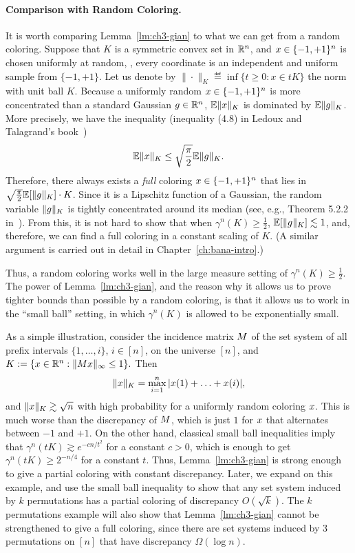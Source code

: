 \paragraph{Comparison with Random Coloring.}
It is worth comparing Lemma~\ref{lm:ch3-gian} to what we can get from
a random coloring.
Suppose that \(K\) is a symmetric
convex set in \(\mathbb{R}^n\), and $x \in \{-1,+1\}^n$ is
chosen uniformly at random, \ie, every coordinate is an independent
and uniform sample from $\{-1,+1\}$. Let us denote by $\|\cdot\|_K
\eqdef \inf\{t \ge 0: x \in tK\}$ the norm with unit ball $K$.
Because a uniformly random $x \in \{-1,+1\}^n$ is more concentrated
than a standard Gaussian $g \in \mathbb{R}^n$, $\mathbb{E}\|x\|_K$ is dominated
by $\mathbb{E}\|g\|_K$. More precisely, we have the inequality (inequality
(4.8) in Ledoux and Talagrand's book~\cite{LedouxTalagrand91})
\begin{align*}
  \mathbb{E}\|x\|_K \le \sqrt{\frac{\pi}{2}}\mathbb{E}\|g\|_K.
\end{align*}
Therefore, there always exists a \emph{full} coloring
\(x \in \{-1,+1\}^n\) that lies in \(\sqrt{\frac{\pi}{2}}\mathbb{E}[\|g\|_K] \cdot
K\).  Since it is a Lipschitz function of a Gaussian, the random
variable \(\|g\|_K\) is tightly concentrated around its median
(see, e.g., Theorem 5.2.2 in~\cite{vershynin}). From this, it is not
hard to show that when \(\gamma^n(K) \ge \frac12\),
\(\mathbb{E}[\|g\|_K] \lesssim 1\), and, therefore, we can find a full
coloring in a constant scaling of \(K\). (A similar argument is
carried out in detail in Chapter~\ref{ch:bana-intro}.)

Thus, a random
coloring works well in the large measure setting of
\(\gamma^n(K) \ge \frac12\). The power of Lemma~\ref{lm:ch3-gian}, and
the reason why it allows us to prove tighter bounds than possible by a
random coloring, is that it allows us to work in the ``small ball''
setting, in which \(\gamma^n(K)\) is allowed to be exponentially
small. 

As a simple illustration, consider the incidence matrix $M$
of the set system of all prefix intervals $\{1, \ldots, i\}$, $i \in
[n]$, on the universe $[n]$, and
\(K:=\{x \in \mathbb{R}^n: \|M x\|_\infty \le 1\}.\)
Then
\[
  \|x\|_K = \max_{i = 1}^n |x(1) + \ldots + x(i)|,
\]
and $\|x\|_K \gtrsim \sqrt{n}$ with high probability for a
uniformly random coloring $x$.  This is much worse than the
discrepancy of $M$, which is just $1$ for $x$ that alternates
between $-1$ and $+1$. On the other hand, classical small ball
inequalities imply that $\gamma^n(tK) \gtrsim e^{-cn/t^2}$ for a
constant $c > 0$, which is enough to get $\gamma^n(tK) \ge 2^{-n/4}$
for a constant $t$. Thus, Lemma~\ref{lm:ch3-gian} is strong enough to
give a partial coloring with constant discrepancy. 
Later, we expand on this example, and use the small ball inequality to show that any set system induced by $k$ permutations has
a partial coloring of discrepancy $O(\sqrt{k})$. The $k$ permutations
example will also show that Lemma~\ref{lm:ch3-gian} cannot be
strengthened to give a full coloring, since there are set systems
induced by $3$ permutations on $[n]$ that have discrepancy
$\Omega(\log n)$.

